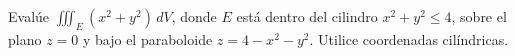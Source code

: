 Evalúe $\iiint_E (x^2+y^2)\,dV$, donde $E$ está dentro del cilindro $x^2+y^2\leq4$, sobre el plano $z=0$ y bajo el paraboloide $z=4-x^2-y^2$. Utilice coordenadas cilíndricas.
